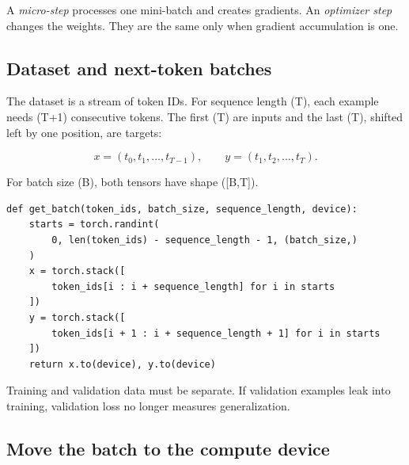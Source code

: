 \begin{center}
\end{center}

A \emph{micro-step} processes one mini-batch and creates gradients. An
\emph{optimizer step} changes the weights. They are the same only when
gradient accumulation is one.

\subsection{Dataset and next-token batches}

The dataset is a stream of token IDs. For sequence length (T), each example
needs (T+1) consecutive tokens. The first (T) are inputs and the last
(T), shifted left by one position, are targets:

\[
  x=(t_0,t_1,\ldots,t_{T-1}),
  \qquad
  y=(t_1,t_2,\ldots,t_T).
\]

For batch size (B), both tensors have shape ([B,T]).

\begin{lstlisting}[style=shadedpython]
def get_batch(token_ids, batch_size, sequence_length, device):
    starts = torch.randint(
        0, len(token_ids) - sequence_length - 1, (batch_size,)
    )
    x = torch.stack([
        token_ids[i : i + sequence_length] for i in starts
    ])
    y = torch.stack([
        token_ids[i + 1 : i + sequence_length + 1] for i in starts
    ])
    return x.to(device), y.to(device)
\end{lstlisting}

Training and validation data must be separate. If validation examples leak
into training, validation loss no longer measures generalization.

\subsection{Move the batch to the compute device}

